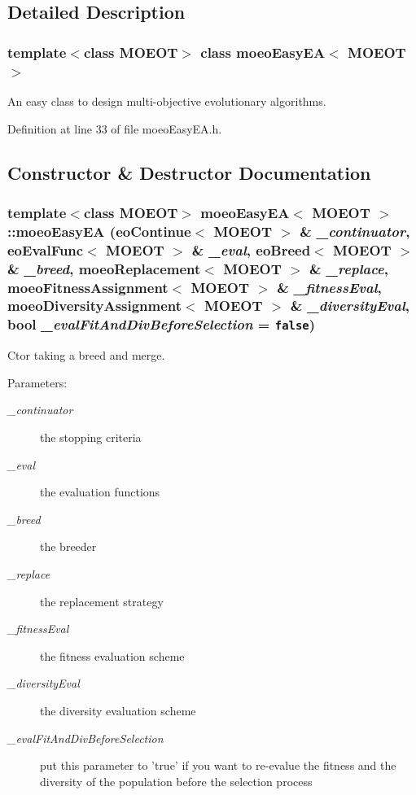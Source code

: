 \subsection{Detailed Description}
\subsubsection*{template$<$class MOEOT$>$ class moeo\-Easy\-EA$<$ MOEOT $>$}

An easy class to design multi-objective evolutionary algorithms. 



Definition at line 33 of file moeo\-Easy\-EA.h.

\subsection{Constructor \& Destructor Documentation}
\subsubsection{\setlength{\rightskip}{0pt plus 5cm}template$<$class MOEOT$>$ \bf{moeo\-Easy\-EA}$<$ MOEOT $>$::\bf{moeo\-Easy\-EA} (\bf{eo\-Continue}$<$ MOEOT $>$ \& {\em \_\-continuator}, \bf{eo\-Eval\-Func}$<$ MOEOT $>$ \& {\em \_\-eval}, \bf{eo\-Breed}$<$ MOEOT $>$ \& {\em \_\-breed}, \bf{moeo\-Replacement}$<$ MOEOT $>$ \& {\em \_\-replace}, \bf{moeo\-Fitness\-Assignment}$<$ MOEOT $>$ \& {\em \_\-fitness\-Eval}, \bf{moeo\-Diversity\-Assignment}$<$ MOEOT $>$ \& {\em \_\-diversity\-Eval}, bool {\em \_\-eval\-Fit\-And\-Div\-Before\-Selection} = {\tt false})\hspace{0.3cm}{\tt  [inline]}}\label{classmoeoEasyEA_3f657699b8ed340ae3f51194206daa20}


Ctor taking a breed and merge. 

\begin{Desc}
\item[Parameters:]
\begin{description}
\item[{\em \_\-continuator}]the stopping criteria \item[{\em \_\-eval}]the evaluation functions \item[{\em \_\-breed}]the breeder \item[{\em \_\-replace}]the replacement strategy \item[{\em \_\-fitness\-Eval}]the fitness evaluation scheme \item[{\em \_\-diversity\-Eval}]the diversity evaluation scheme \item[{\em \_\-eval\-Fit\-And\-Div\-Before\-Selection}]put this parameter to 'true' if you want to re-evalue the fitness and the diversity of the population before the selection process \end{description}
\end{Desc}


